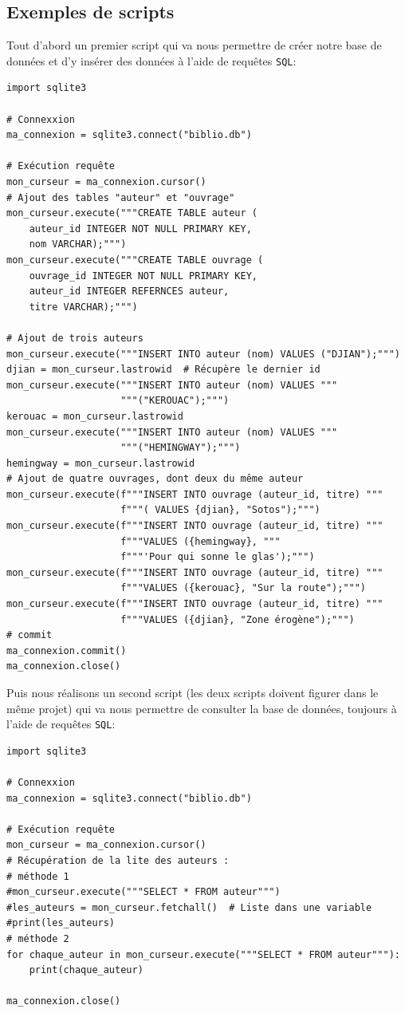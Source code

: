 \documentclass[a4paper,12pt]{book}
\begin{document}
\subsection*{Exemples de scripts}
Tout d'abord un premier script qui va nous permettre de créer notre base de données et d'y insérer des données à l'aide de requêtes \texttt{SQL}:
\begin{lstlisting}
import sqlite3

# Connexxion
ma_connexion = sqlite3.connect("biblio.db")

# Exécution requête
mon_curseur = ma_connexion.cursor()
# Ajout des tables "auteur" et "ouvrage"
mon_curseur.execute("""CREATE TABLE auteur (
    auteur_id INTEGER NOT NULL PRIMARY KEY,
    nom VARCHAR);""")
mon_curseur.execute("""CREATE TABLE ouvrage (
    ouvrage_id INTEGER NOT NULL PRIMARY KEY,
    auteur_id INTEGER REFERNCES auteur,
    titre VARCHAR);""")

# Ajout de trois auteurs
mon_curseur.execute("""INSERT INTO auteur (nom) VALUES ("DJIAN");""")
djian = mon_curseur.lastrowid  # Récupère le dernier id
mon_curseur.execute("""INSERT INTO auteur (nom) VALUES """
                    """("KEROUAC");""")
kerouac = mon_curseur.lastrowid
mon_curseur.execute("""INSERT INTO auteur (nom) VALUES """
                    """("HEMINGWAY");""")
hemingway = mon_curseur.lastrowid
# Ajout de quatre ouvrages, dont deux du même auteur
mon_curseur.execute(f"""INSERT INTO ouvrage (auteur_id, titre) """
                    f"""( VALUES {djian}, "Sotos");""")
mon_curseur.execute(f"""INSERT INTO ouvrage (auteur_id, titre) """
                    f"""VALUES ({hemingway}, """
                    f"""'Pour qui sonne le glas');""")
mon_curseur.execute(f"""INSERT INTO ouvrage (auteur_id, titre) """ 
                    f"""VALUES ({kerouac}, "Sur la route");""")
mon_curseur.execute(f"""INSERT INTO ouvrage (auteur_id, titre) """
                    f"""VALUES ({djian}, "Zone érogène");""")
# commit
ma_connexion.commit()
ma_connexion.close()
\end{lstlisting}
\medskip

Puis nous réalisons un second script (les deux scripts doivent figurer dans le même projet) qui va nous permettre de consulter la base de données, toujours à l'aide de requêtes \texttt{SQL}:
\begin{lstlisting}
import sqlite3

# Connexxion
ma_connexion = sqlite3.connect("biblio.db")

# Exécution requête
mon_curseur = ma_connexion.cursor()
# Récupération de la lite des auteurs :
# méthode 1
#mon_curseur.execute("""SELECT * FROM auteur""")
#les_auteurs = mon_curseur.fetchall()  # Liste dans une variable
#print(les_auteurs)
# méthode 2
for chaque_auteur in mon_curseur.execute("""SELECT * FROM auteur"""):
    print(chaque_auteur)

ma_connexion.close()
\end{lstlisting}
\end{document}
